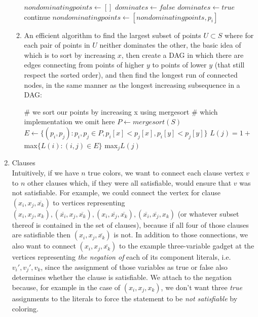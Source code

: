 \documentclass[a4paper]{article}
\begin{document}
\begin{enumerate}
\begin{enumerate}
		\begin{algorithmic}
		\State $nondominatingpoints \gets []$
			\State $dominates \gets false$
					\State $dominates \gets true$
				\EndIf
			\EndFor
				\State continue
			\EndIf
			\State $nondominatingpoints \gets [nondominatingpoints, p_i]$
		\EndFor
		\end{algorithmic}
	\item An efficient algorithm to find the largest subset of points $U \subset S$ where for each pair of points in $U$ neither dominates the other, the basic idea of which is to sort by increasing $x$, then create a DAG in which there are edges connecting from points of higher $y$ to points of lower $y$ (that still respect the sorted order), and then find the longest run of connected nodes, in the same manner as the longest increasing subsequence in a DAG:
		\begin{algorithmic}
		\State \# we sort our points by increasing x using mergesort
		\State \# which implementation we omit here
		\State $P \gets mergesort(S)$
		\State $E \gets \{(p_i, p_j): p_i, p_j \in P, p_i[x] < p_j[x], p_i[y] < p_j[y]\}$
		\For{$j = 1, 2, ..., n:$}
			\State $L(j) = 1 + $max$\{L(i) : (i, j) \in E\}$
		\EndFor
		\State \Return max$_j L(j)$
		\end{algorithmic}
	\end{enumerate}
\item Clauses\\
	 Intuitively, if we have $n$ true colors, we want to connect each clause vertex $v$ to $n$ other clauses which, if they were all satisfiable, would ensure that $v$ was not satisfiable.  For example, we could connect the vertex for clause $(x_i, x_j, \overline{x_k})$ to vertices representing $(x_i, x_j, x_k), (\overline{x_i}, x_j, \overline{x_k}), (x_i, \overline{x_j}, \overline{x_k}), (\overline{x_i}, \overline{x_j}, x_k)$ (or whatever subset thereof is contained in the set of clauses), because if all four of those clauses are satisfiable then $(x_i, x_j, \overline{x_k})$ is not.  In addition to those connections, we also want to connect $(x_i, x_j, \overline{x_k})$ to the example three-variable gadget at the vertices representing \emph{the negation of} each of its component literals, i.e. $v_i ', v_j ', v_k$, since the assignment of those variables as true or false also determines whether the clause is satisfiable.  We attach to the negation because, for example in the case of $(x_i , x_j , x_k)$, we don't want three \emph{true} assignments to the literals to force the statement to be \emph{not satisfiable} by coloring.

\end{enumerate}
\end{document}
